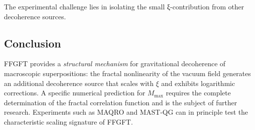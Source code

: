 	The experimental challenge lies in isolating the small ξ-contribution from other decoherence sources.
	
	\subsection*{Conclusion}
	
	FFGFT provides a \emph{structural mechanism} for gravitational decoherence of macroscopic superpositions: the fractal nonlinearity of the vacuum field generates an additional decoherence source that scales with \(\xi\) and exhibits logarithmic corrections. A specific numerical prediction for \(M_{\max}\) requires the complete determination of the fractal correlation function and is the subject of further research. Experiments such as MAQRO and MAST-QG can in principle test the characteristic scaling signature of FFGFT.


